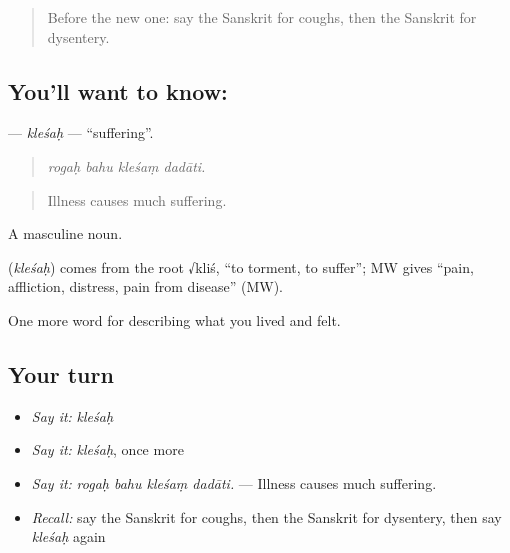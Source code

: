 \label{lesson:SA-C478-klesah}



\begin{quote}
Before the new one: say the Sanskrit for coughs, then the Sanskrit for dysentery.
\end{quote}

\subsection*{You'll want to know: }
\textbf{} — \emph{kleśaḥ} — \textquotedblleft{}suffering\textquotedblright{}.

\begin{quote}
   
\end{quote}

\begin{quote}
\emph{rogaḥ bahu kleśaṃ dadāti.}
\end{quote}

\begin{quote}
Illness causes much suffering.
\end{quote}

A masculine noun.

\begin{cousinweb}
\textbf{} (\emph{kleśaḥ}) comes from the root √kliś, \textquotedblleft{}to torment, to suffer\textquotedblright{}; MW gives \textquotedblleft{}pain, affliction, distress, pain from disease\textquotedblright{} (MW).
\end{cousinweb}

\begin{grammarlens}[title={What you've built}]
One more word for describing what you lived and felt.
\end{grammarlens}

\subsection*{Your turn}
\begin{itemize}
\raggedright
  \item \emph{Say it:} \emph{kleśaḥ}
  \item \emph{Say it:} \emph{kleśaḥ}, once more
  \item \emph{Say it:} \emph{rogaḥ bahu kleśaṃ dadāti.} — Illness causes much suffering.
  \item \emph{Recall:} say the Sanskrit for coughs, then the Sanskrit for dysentery, then say \emph{kleśaḥ} again
\end{itemize}


